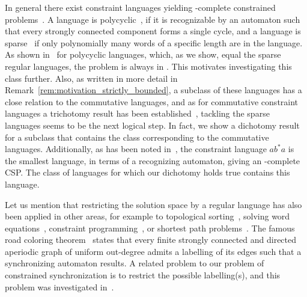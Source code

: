 In general there exist constraint languages yielding 
\PSPACE-complete constrained problems~\cite{DBLP:conf/mfcs/FernauGHHVW19}. 
A language is polycyclic~\cite{DBLP:conf/ictcs/Hoffmann20}, if it is recognizable by an automaton
such that every strongly connected component forms a single cycle,
and a language is sparse~\cite{DBLP:reference/hfl/Yu97} if only polynomially many words of a specific length are in the language.
As shown in~\cite{DBLP:conf/ictcs/Hoffmann20}
for polycyclic languages, which, as we show, equal the sparse regular
languages, the problem is always in \NP. This motivates investigating this class further. 
Also, as written in more detail in Remark~\ref{rem:motivation_strictly_bounded},
a subclass of these languages has a close relation to the commutative languages, and as for commutative constraint
languages a trichotomy result has been established~\cite{DBLP:conf/cocoon/Hoffmann20},
tackling the sparse languages seems to be the next logical step.
In fact, we show a dichotomy result for a subclass
that contains the class corresponding to the commutative languages.
Additionally, as has been noted in~\cite{DBLP:conf/mfcs/FernauGHHVW19},
the constraint language $ab^*a$ is the smallest language, in terms of a recognizing
automaton, giving an \NP-complete CSP. The class of languages
for which our dichotomy holds true contains this language.





Let us mention that restricting the solution space by a regular language
has also been applied in other areas, for example to topological sorting~\cite{DBLP:conf/icalp/AmarilliP18},
solving word equations~\cite{Diekert98TR,DBLP:journals/iandc/DiekertGH05}, constraint programming~\cite{DBLP:conf/cp/Pesant04}, or
shortest path problems~\cite{DBLP:journals/ipl/Romeuf88}.
The famous road coloring theorem~\cite{adler1970similarity,Trahtman09} states
that every finite strongly connected and directed aperiodic graph of uniform out-degree admits a labelling of its edges 
such that a synchronizing
automaton results. A related problem to our problem of constrained synchronization is to restrict the possible labelling(s), and
this problem was investigated in~\cite{DBLP:journals/jcss/VorelR19}.






